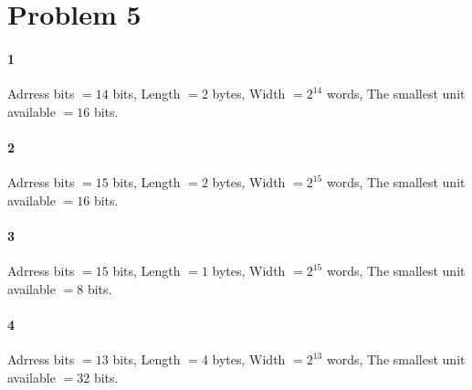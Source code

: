\documentclass[11pt]{article}
\begin{document}
\section{Problem 5}
\paragraph{1}
Adrress bits $= 14$ bits, \qquad Length $= 2$ bytes, \qquad Width $= 2^{14}$ words, \qquad The smallest unit available $= 16$ bits.
\paragraph{2}
Adrress bits $= 15$ bits, \qquad Length $= 2$ bytes, \qquad Width $= 2^{15}$ words, \qquad The smallest unit available $= 16$ bits.
\paragraph{3}
Adrress bits $= 15$ bits, \qquad Length $= 1$ bytes, \qquad Width $= 2^{15}$ words, \qquad The smallest unit available $= 8$ bits.
\paragraph{4}
Adrress bits $= 13$ bits, \qquad Length $= 4$ bytes, \qquad Width $= 2^{13}$ words, \qquad The smallest unit available $= 32$ bits.
\end{document}
